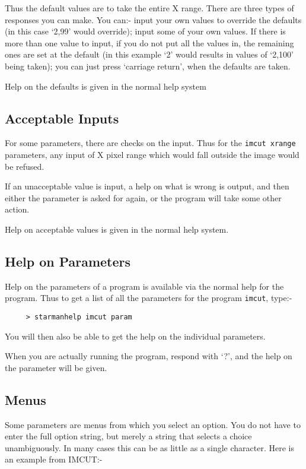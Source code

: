 Thus the default values are to take the entire X range. There are three
types of responses you can make. You can:- input your own values to
override the defaults (in this case `2,99' would override); input some
of your own values. If there is more than one value to input, if you do
not put all the values in, the remaining ones are set at the default
(in this example `2' would results in values of `2,100' being taken);
you can just press `carriage return', when the defaults are taken.

Help on the defaults is given in the normal help system

\subsection{Acceptable Inputs} \label{se:param_acc}

For some parameters, there are checks on the input. Thus for the
\verb|imcut xrange| parameters, any input of X pixel range which would
fall outside the image would be refused.

If an unacceptable value is input, a help on what is wrong is output,
and then either the parameter is asked for again, or the program will
take some other action.

Help on acceptable values is given in the normal help system.

\subsection{Help on Parameters} \label{se:param_hel}

Help on the parameters of a program is available via the normal help
for the program. Thus to get a list of all the parameters for the
program \verb|imcut|, type:- \begin{verbatim}
     > starmanhelp imcut param \end{verbatim}

You will then also be able to get the help on the individual
parameters.

When you are actually running the program, respond with `?', and the
help on the parameter will be given.


\subsection{Menus}

Some \starman parameters are menus from which you select an option.
You do not have to enter the full option string, but merely a string
that selects a choice unambiguously.  In many cases this can be as
little as a single character.  Here is an example from IMCUT:-

